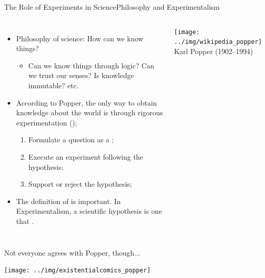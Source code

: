 \begin{frame}{The Role of Experiments in Science}{Philosophy and Experimentalism}
  \begin{columns}
    \begin{itemize}
      \item Philosophy of science: How can we know things?
      \begin{itemize}
        \item Can we know things through logic? Can we trust our senses? Is knowledge immutable? etc.
      \end{itemize}\bigskip

      \item According to Popper, the only way to obtain knowledge about the world is through rigorous experimentation ();
      \begin{enumerate}
        \item Formulate a question as a ;
        \item Execute an experiment following the hypothesis;
        \item Support or reject the hypothesis;
      \end{enumerate}\bigskip

      \item The definition of  is important. In Experimentalism, a scientific hypothesis is one that .
    \end{itemize}

    \texttt{[image: ../img/wikipedia\_popper]}\\
    Karl Popper (1902--1994)
  \end{columns}
\end{frame}

\begin{frame}{Not everyone agrees with Popper, though...}
  \begin{center}
    \texttt{[image: ../img/existentialcomics\_popper]}
  \end{center}
\end{frame}

